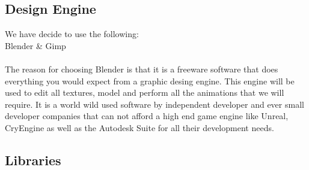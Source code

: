 \documentclass[letterpaper]{article}
\begin{document}
			\vspace{0.1cm}
			
			\subsection*{Design Engine}
			
			\vspace{0.1cm}
			
			We have decide to use the following: \\
			\indent Blender \& Gimp \\
			\\
			The reason for choosing Blender is that it is a freeware software that does everything you would expect from a graphic desing engine. This engine will be used to edit all textures, model and perform all the animations that we will require. It is a world wild used software by independent developer and ever small developer companies that can not afford a high end game engine like Unreal, CryEngine as well as the Autodesk Suite for all their development needs.
			
			\vspace{0.1cm}
			
			\subsection*{Libraries}
			
			\vspace{0.1cm}
			
\end{document}
